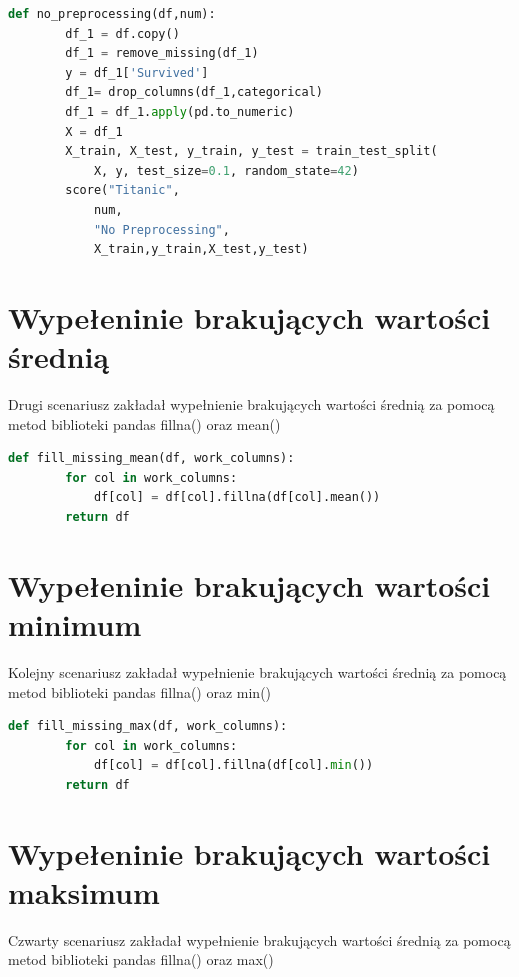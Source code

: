 \documentclass{book}
\begin{document}
\begin{lstlisting}[language=Python, caption={Brak przygotowania
     danych dla zbioru danych Titanic}, captionpos=b]
    def no_preprocessing(df,num):
        df_1 = df.copy()
        df_1 = remove_missing(df_1)
        y = df_1['Survived']
        df_1= drop_columns(df_1,categorical)
        df_1 = df_1.apply(pd.to_numeric)
        X = df_1
        X_train, X_test, y_train, y_test = train_test_split(
            X, y, test_size=0.1, random_state=42)
        score("Titanic",
            num,
            "No Preprocessing",
            X_train,y_train,X_test,y_test)
    \end{lstlisting}

\section{Wypełeninie brakujących wartości średnią}
Drugi scenariusz zakładał wypełnienie brakujących 
wartości średnią za pomocą metod biblioteki pandas 
fillna() oraz mean()

\begin{lstlisting}[language=Python, caption={Wypełnienie 
    brakujących wartości średnią}, captionpos=b]
    def fill_missing_mean(df, work_columns):
        for col in work_columns:
            df[col] = df[col].fillna(df[col].mean())
        return df
\end{lstlisting}

\section{Wypełeninie brakujących wartości minimum}
Kolejny scenariusz zakładał wypełnienie brakujących 
wartości średnią za pomocą metod biblioteki pandas fillna() 
oraz min()

\begin{lstlisting}[language=Python, caption={Wypełnienie 
    brakujących wartości minimum}, captionpos=b]
    def fill_missing_max(df, work_columns):
        for col in work_columns:
            df[col] = df[col].fillna(df[col].min())
        return df
\end{lstlisting}

\section{Wypełeninie brakujących wartości maksimum}
Czwarty scenariusz zakładał wypełnienie brakujących 
wartości średnią za pomocą metod biblioteki pandas 
fillna() oraz max()
\end{document}

